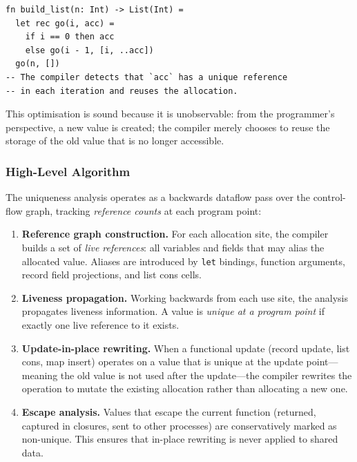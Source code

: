 \documentclass[11pt]{article}
\theoremstyle{definition}
\theoremstyle{remark}
\begin{document}
\begin{lstlisting}[caption={Compiler-optimised in-place update.}]
fn build_list(n: Int) -> List(Int) =
  let rec go(i, acc) =
    if i == 0 then acc
    else go(i - 1, [i, ..acc])
  go(n, [])
-- The compiler detects that `acc` has a unique reference
-- in each iteration and reuses the allocation.
\end{lstlisting}

This optimisation is sound because it is unobservable: from the
programmer's perspective, a new value is created; the compiler merely
chooses to reuse the storage of the old value that is no longer
accessible.

\subsubsection{High-Level Algorithm}

The uniqueness analysis operates as a backwards dataflow pass over
the control-flow graph, tracking \emph{reference counts} at each
program point:

\begin{enumerate}
  \item \textbf{Reference graph construction.}  For each allocation
    site, the compiler builds a set of \emph{live references}: all
    variables and fields that may alias the allocated value.  Aliases
    are introduced by \texttt{let} bindings, function arguments,
    record field projections, and list cons cells.

  \item \textbf{Liveness propagation.}  Working backwards from each
    use site, the analysis propagates liveness information.  A value
    is \emph{unique at a program point} if exactly one live reference
    to it exists.

  \item \textbf{Update-in-place rewriting.}  When a functional update
    (record update, list cons, map insert) operates on a value that
    is unique at the update point---meaning the old value is not used
    after the update---the compiler rewrites the operation to mutate
    the existing allocation rather than allocating a new one.

  \item \textbf{Escape analysis.}  Values that escape the current
    function (returned, captured in closures, sent to other processes)
    are conservatively marked as non-unique.  This ensures that
    in-place rewriting is never applied to shared data.
\end{enumerate}
\end{document}
